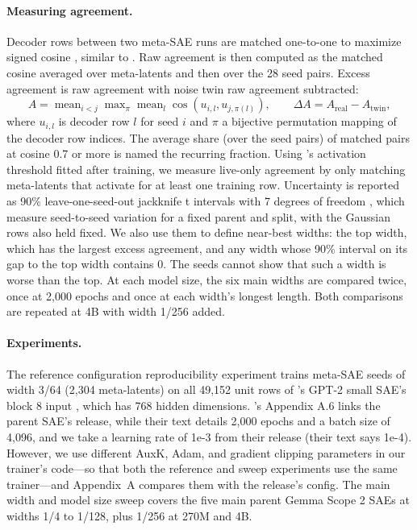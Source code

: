\paragraph{Measuring agreement.}
Decoder rows between two meta-SAE runs are matched one-to-one to maximize signed cosine \citep{kuhn1955hungarian}, similar to \citet{fel2025archetypal}.
Raw agreement is then computed as the matched cosine averaged over meta-latents and then over the 28 seed pairs.
Excess agreement is raw agreement with noise twin raw agreement subtracted:
\begin{equation}
  A = \operatorname{mean}_{i<j} \max\nolimits_{\pi} \operatorname{mean}_{l} \cos(u_{i,l}, u_{j,\pi(l)}), \qquad \Delta A = A_{\mathrm{real}} - A_{\mathrm{twin}},
  \label{eq:agreement}
\end{equation}
where $u_{i,l}$ is decoder row $l$ for seed $i$ and $\pi$ a bijective permutation mapping of the decoder row indices.
The average share (over the seed pairs) of matched pairs at cosine 0.7 or more is named the recurring fraction.
Using \citeauthor{bussmann2024batchtopk}'s \citeyearpar{bussmann2024batchtopk} activation threshold fitted after training, we measure live-only agreement by only matching meta-latents that activate for at least one training row.
Uncertainty is reported as 90\% leave-one-seed-out jackknife t intervals with 7 degrees of freedom \citep{efron1979bootstrap}, which measure seed-to-seed variation for a fixed parent and split, with the Gaussian rows also held fixed.
We also use them to define near-best widths: the top width, which has the largest excess agreement, and any width whose 90\% interval on its gap to the top width contains 0.
The seeds cannot show that such a width is worse than the top.
At each model size, the six main widths are compared twice, once at 2,000 epochs and once at each width's longest length.
Both comparisons are repeated at 4B with width 1/256 added.

\paragraph{Experiments.}
The reference configuration reproducibility experiment trains meta-SAE seeds of width 3/64 (2,304 meta-latents) on all 49,152 unit rows of \citeauthor{bloom2024gpt2featuresplitting}'s \citeyearpar{bloom2024gpt2featuresplitting} GPT-2 small SAE's block 8 input \citep{radford2019language}, which has 768 hidden dimensions.
\citeauthor{leask2025canonical}'s \citeyearpar{leask2025canonical} Appendix A.6 links the parent SAE's release, while their text details 2,000 epochs and a batch size of 4,096, and we take a learning rate of 1e-3 from their release (their text says 1e-4).
However, we use different AuxK, Adam, and gradient clipping parameters in our trainer's code---so that both the reference and sweep experiments use the same trainer---and Appendix~A compares them with the release's config.
The main width and model size sweep covers the five main parent Gemma Scope 2 SAEs at widths 1/4 to 1/128, plus 1/256 at 270M and 4B.

